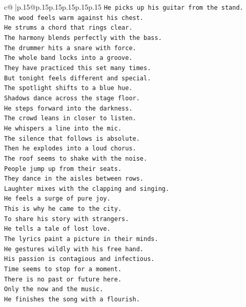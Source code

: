 \documentclass{article}
\begin{document}
{\begin{supertabular}{c@{$\;$}|p{.15\linewidth}@{}p{.15\linewidth}p{.15\linewidth}p{.15\linewidth}p{.15\linewidth}p{.15\linewidth}}
{{{\texttt{He picks up his guitar from the stand.} \\
\texttt{The wood feels warm against his chest.} \\
\texttt{He strums a chord that rings clear.} \\
\texttt{The harmony blends perfectly with the bass.} \\
\texttt{The drummer hits a snare with force.} \\
\texttt{The whole band locks into a groove.} \\
\texttt{They have practiced this set many times.} \\
\texttt{But tonight feels different and special.} \\
\texttt{The spotlight shifts to a blue hue.} \\
\texttt{Shadows dance across the stage floor.} \\
\texttt{He steps forward into the darkness.} \\
\texttt{The crowd leans in closer to listen.} \\
\texttt{He whispers a line into the mic.} \\
\texttt{The silence that follows is absolute.} \\
\texttt{Then he explodes into a loud chorus.} \\
\texttt{The roof seems to shake with the noise.} \\
\texttt{People jump up from their seats.} \\
\texttt{They dance in the aisles between rows.} \\
\texttt{Laughter mixes with the clapping and singing.} \\
\texttt{He feels a surge of pure joy.} \\
\texttt{This is why he came to the city.} \\
\texttt{To share his story with strangers.} \\
\texttt{He tells a tale of lost love.} \\
\texttt{The lyrics paint a picture in their minds.} \\
\texttt{He gestures wildly with his free hand.} \\
\texttt{His passion is contagious and infectious.} \\
\texttt{Time seems to stop for a moment.} \\
\texttt{There is no past or future here.} \\
\texttt{Only the now and the music.} \\
\texttt{He finishes the song with a flourish.} \\
}}}
\end{supertabular}}
\end{document}
